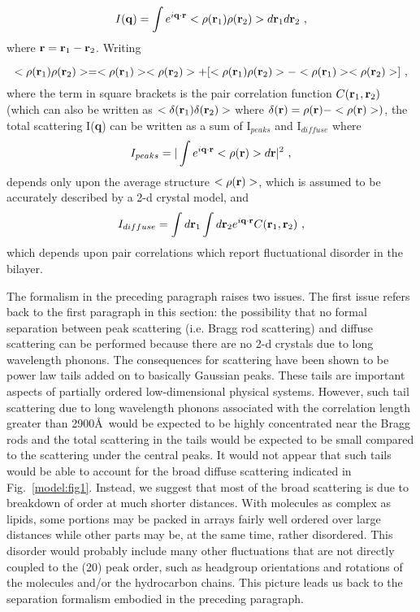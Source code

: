 \begin{equation}
\label{nagle1}
I({\bf q}) = \int e^{i {\bf q} \cdot {\bf r}} <\rho ({\bf r}_{1}) 
\rho ({\bf r}_{2})> d {\bf r}_{1} d {\bf r}_{2}~,
\end{equation}
where \( {\bf r} = {\bf r}_{1} - {\bf r}_{2} \).  Writing

\begin{equation}
\label{nagle2}
<\rho ({\bf r}_{1}) \rho ({\bf r}_{2})> = <\rho ({\bf r}_{1})> <\rho ({\bf r}_{2})> + [<\rho ({\bf r}_{1}) \rho ({\bf r}_{2})> - <\rho ({\bf r}_{1})> <\rho ({\bf r}_{2})>]~, 
\end{equation}
where the term in square brackets is the pair correlation function 
\( C({\bf r}_{1},{\bf r}_{2}) \) (which can also be written as
\( <\delta ({\bf r}_{1}) \delta({\bf r}_{2})> \) 
where \( \delta({\bf r})=\rho({\bf r}) - <\rho({\bf r})>) \),
the total scattering I({\bf q}) can be written as a sum \cite{Zach} of I$_{peaks}$ 
and I$_{diffuse}$ where 
\begin{equation} 
\label{nagle3} 
I_{peaks} = | \int e^{i {\bf q} \cdot {\bf r}} <\rho({\bf r})> d{\bf r} |^{2}~,
\end{equation}
depends only upon the average structure $<\rho({\bf r})>$, 
which is assumed to be accurately described by a 2-d crystal model, and
\begin{equation}
\label{nagle4}
I_{diffuse} = \int d {\bf r}_{1} \int d {\bf r}_{2} e^{i {\bf q} \cdot {\bf r}} C({\bf r}_{1},{\bf r}_{2})~,
\end{equation}
which depends upon pair correlations which report fluctuational disorder in the
bilayer.  

The formalism in the preceding paragraph raises two issues.  
The first issue refers back to the first paragraph in this section:
the possibility that no formal separation between peak scattering (i.e. Bragg rod
scattering) and diffuse scattering can be performed because there are no
2-d crystals due to long wavelength phonons.  The consequences for scattering
have been shown \cite{Dutta} to be power law tails added on to basically
Gaussian peaks.  These tails are important aspects of partially ordered
low-dimensional physical systems.  However, such tail scattering due
to long wavelength phonons associated with the correlation length greater than
2900\AA\ would be expected to be highly concentrated near the Bragg rods and 
the total scattering in the tails would be expected to be small compared
to the scattering under the central peaks.  It would not appear that such
tails would be
able to account for the broad diffuse scattering indicated in Fig.\ \ref{model:fig1}.  
Instead, we suggest that most of the broad scattering is due to breakdown of order
at much shorter distances.  With molecules as complex as lipids,
some portions may be packed in arrays fairly well ordered over large
distances while other parts may be, at the same time, rather disordered.
This disorder would probably include
many other fluctuations that are not directly coupled to 
the (20) peak order, such as headgroup orientations and rotations 
of the molecules and/or the hydrocarbon chains.  This
picture leads us back to the separation formalism embodied in the preceding paragraph.

